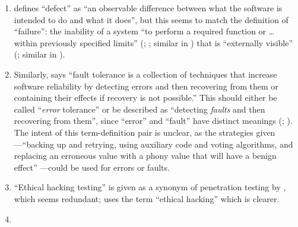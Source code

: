 \begin{enumerate}
    \item %
           \citet[p.~1\=/1]{SWEBOK2024} defines ``defect'' as ``an
          observable difference between what the software is intended to do and
          what it does'', but this seems to match the definition of
          ``failure'': the inability of a system ``to perform a required
          function or \dots{} within previously specified limits''
          (\citealp[p.~7]{IEEE2019a}; \citeyear[p.~139]{IEEE2010}%
          ; similar in \citealp[p.~400]{vanVliet2000})
          that is ``externally visible'' (\citealp[p.~7]{IEEE2019a}; similar in
          \citealp[p.~400]{vanVliet2000}).
    \item %
          Similarly, \citet[p.~4\=/11]{SWEBOK2024} says ``fault tolerance is
          a collection of techniques that increase software reliability by
          detecting errors and then recovering from them or containing their
          effects if recovery is not possible.'' This should either be called
          ``\emph{error} tolerance'' or be described as ``detecting
          \emph{faults} and then recovering from them'', since ``error'' and
          ``fault'' have distinct meanings (\citealp[p.~5\=/3]{SWEBOK2024};
          \citealp[pp.~399\==400]{vanVliet2000}). The intent of this
          term-definition pair is unclear, as the strategies given---``backing
          up and retrying, using auxiliary code and voting algorithms, and
          replacing an erroneous value with a phony value that will have a
          benign effect'' \citep[p.~4\=/11]{SWEBOK2024}---could be used for
          errors or faults.
    \item %
          ``Ethical hacking testing'' is given as a synonym of penetration
          testing by \citet[p.~13\=/4]{SWEBOK2024}, which seems redundant;
          \citet[p.~28]{Gerrard2000b} uses the term ``ethical hacking'' which
          is clearer.
    \item %

\end{enumerate}
